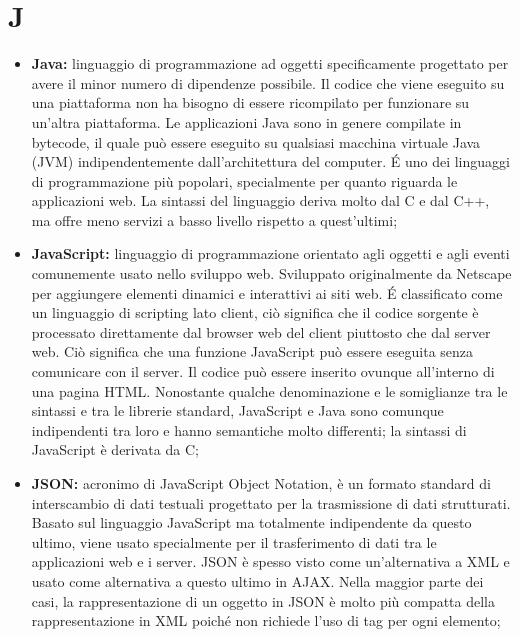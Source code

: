 \section*{J} %
\label{sec:j}
	\begin{itemize}
		\item \textbf{Java:} linguaggio di programmazione ad oggetti specificamente progettato per avere il minor numero di dipendenze possibile. Il codice che viene eseguito su una piattaforma non ha bisogno di essere ricompilato per funzionare su un'altra piattaforma. Le applicazioni Java sono in genere compilate in bytecode, il quale può essere eseguito su qualsiasi macchina virtuale Java (JVM) indipendentemente dall'architettura del computer. É uno dei linguaggi di programmazione più popolari, specialmente per quanto riguarda le applicazioni web. La sintassi del linguaggio deriva molto dal C e dal C++, ma offre meno servizi a basso livello rispetto a quest'ultimi;
		\item \textbf{JavaScript:} linguaggio di programmazione orientato agli oggetti e agli eventi comunemente usato nello sviluppo web. Sviluppato originalmente da Netscape per aggiungere elementi dinamici e interattivi ai siti web. É classificato come un linguaggio di scripting lato client, ciò significa che il codice sorgente è processato direttamente dal browser web del client piuttosto che dal server web. Ciò significa che una funzione JavaScript può essere eseguita senza comunicare con il server. Il codice può essere inserito ovunque all'interno di una pagina HTML. Nonostante qualche denominazione e le somiglianze tra le sintassi e tra le librerie standard, JavaScript e Java sono comunque indipendenti tra loro e hanno semantiche molto differenti; la sintassi di JavaScript è derivata da C;
		\item \textbf{JSON:} acronimo di JavaScript Object Notation, è un formato standard di interscambio di dati testuali progettato per la trasmissione di dati strutturati. Basato sul linguaggio JavaScript ma totalmente indipendente da questo ultimo, viene usato specialmente per il trasferimento di dati tra le applicazioni web e i server. JSON è spesso visto come un'alternativa a XML e usato come alternativa a questo ultimo in AJAX. Nella maggior parte dei casi, la rappresentazione di un oggetto in JSON è molto più compatta della rappresentazione in XML poiché non richiede l'uso di tag per ogni elemento;
	\end{itemize}
\pagebreak

